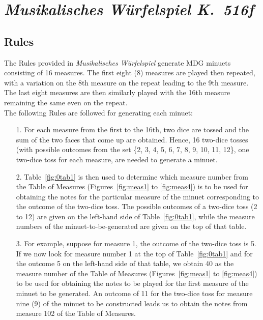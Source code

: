 \documentclass[letterpaper,x11names,svgnames,10pt]{article}
\begin{document}
{\section{\em Musikalisches W\"{u}rfelspiel K.\ 516f}

\subsection{Rules}

The Rules provided in {\em Musikalisches W\"{u}rfelspiel} generate MDG minuets consisting of 16 measures.  The first eight (8) measures are played then repeated, with a variation on the 8th measure on the repeat leading to the 9th measure.  The last eight measures are then similarly played with the 16th measure remaining the same even on the repeat. \\

The following Rules are followed for generating each minuet:
\begin{enumerate}
	\item [1.] For each measure from the first to the 16th, two dice are tossed and the sum of the two faces that come up are obtained.  Hence, 16 two-dice tosses (with possible outcomes from the set \{2, 3, 4, 5, 6, 7, 8, 9, 10, 11, 12\}, one two-dice toss for each measure, are needed to generate a minuet.   
	\item [2.] Table~\ref{fig:0tab1} is then used to determine which measure number from the Table of Measures (Figures~\ref{fig:meas1} to \ref{fig:meas4}) is to be used for obtaining the notes for the particular measure of the minuet corresponding to the outcome of the two-dice toss.  The possible outcomes of a two-dice toss (2 to 12) are given on the left-hand side of Table~\ref{fig:0tab1}, while the measure numbers of the minuet-to-be-generated are given on the top of that table.
	\item [3.]  For example, suppose for measure 1, the outcome of the two-dice toss is 5.  If we now look for measure number 1 at the top of Table~\ref{fig:0tab1} and for the outcome 5 on the left-hand side of that table, we obtain 40 as the measure number of the Table of Measures (Figures~\ref{fig:meas1} to \ref{fig:meas4}) to be used for obtaining the notes to be played for the first measure of the minuet to be generated.  An outcome of 11 for the two-dice toss for measure nine (9) of the minuet to be constructed leads us to obtain the notes from measure 102 of the Table of Measures.
\end{enumerate}   


}
\end{document}
